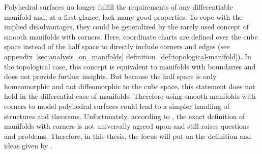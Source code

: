 \documentclass{stdlocal}
\begin{document}
  Polyhedral surfaces no longer fulfill the requirements of any differentiable manifold and, at a first glance, lack many good properties.
  To cope with the implied disadvantages, they could be generalized by the rarely used concept of smooth manifolds with corners.
  Here, coordinate charts are defined over the cube space instead of the half space to directly include corners and edges (see appendix~\ref{sec:analysis_on_manifolds} definition~\ref{def:topological-manifold}).
  In the topological case, this concept is equivalent to manifolds with boundaries and does not provide further insights.
  But because the half space is only homeomorphic and not diffeomorphic to the cube space, this statement does not hold in the differential case of manifolds.
  Therefore using smooth manifolds with corners to model polyhedral surfaces could lead to a simpler handling of structures and theorems.
  Unfortunately, according to \textcite{joyce2009}, the exact definition of manifolds with corners is not universally agreed upon and still raises questions and problems.
  Therefore, in this thesis, the focus will put on the definition and ideas given by \textcite{polthier2006}.
  \autocite{joyce2009}
\end{document}
